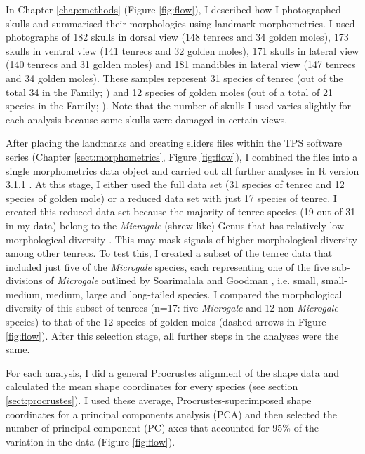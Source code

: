 	In Chapter \ref{chap:methods} (Figure \ref{fig:flow}), I described how I photographed skulls and summarised their morphologies using landmark morphometrics. I used photographs of 182 skulls in dorsal view (148 tenrecs and 34 golden moles), 173 skulls in ventral view (141 tenrecs and 32 golden moles), 171 skulls in lateral view (140 tenrecs and 31 golden moles) and 181 mandibles in lateral view (147 tenrecs and 34 golden moles). These samples represent 31 species of tenrec (out of the total 34 in the Family; \citealp{Olson2013}) and 12 species of golden moles (out of a total of 21 species in the Family; \citealp{Asher2010}). Note that the number of skulls I used varies slightly for each analysis because some skulls were damaged in certain views.
	

	After placing the landmarks and creating sliders files within the TPS software series (Chapter \ref{sect:morphometrics}, Figure \ref{fig:flow}), I combined the files into a single morphometrics data object and carried out all further analyses in R version 3.1.1 \citep{Team2014}. At this stage, I either used the full data set (31 species of tenrec and 12 species of golden mole) or a reduced data set with just 17 species of tenrec. I created this reduced data set because the majority of tenrec species (19 out of 31 in my data) belong to the \textit{Microgale} (shrew-like) Genus that has relatively low morphological diversity \citep{Soarimalala2011, Jenkins2003}. This may mask signals of higher morphological diversity among other tenrecs. To test this, I created a subset of the tenrec data that included just five of the \textit{Microgale} species, each representing one of the five sub-divisions of \textit{Microgale} outlined by Soarimalala and Goodman \citeyearpar{Soarimalala2011}, i.e. small, small-medium, medium, large and long-tailed species. I compared the morphological diversity of this subset of tenrecs (n=17: five \textit{Microgale} and 12 non \textit{Microgale} species) to that of the 12 species of golden moles (dashed arrows in Figure \ref{fig:flow}). After this selection stage, all further steps in the analyses were the same.
		
	For each analysis, I did a general Procrustes alignment of the shape data and calculated the mean shape coordinates for every species (see section \ref{sect:procrustes}). I used these average, Procrustes-superimposed shape coordinates for a principal components analysis (PCA) and then selected the number of principal component (PC) axes that accounted for 95\% of the variation in the data (Figure \ref{fig:flow}).
	

